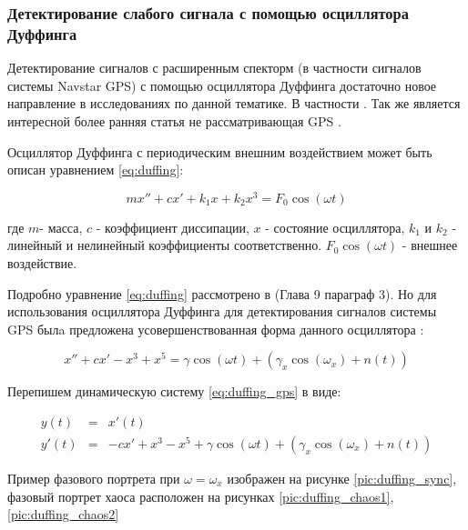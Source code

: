 \subsubsection{Детектирование слабого сигнала с помощью осциллятора Дуффинга}
\label{ssec:duffing}

Детектирование сигналов с расширенным спекторм (в частности сигналов системы Navstar GPS) с помощью осциллятора Дуффинга
достаточно новое направление в исследованиях по данной тематике. В частности
\cite{chaos_chen, chaos_cambridge, chaos_huang, chaos_song}. Так же является интересной более ранняя статья не рассматривающая GPS
\cite{chaos_wang}.

Осциллятор Дуффинга с периодическим внешним воздействием может быть описан уравнением \ref{eq:duffing}:

\begin{center}
\begin{equation}
	\label{eq:duffing}
	mx'' + cx' + k_{1}x + k_{2}x^3 = F_{0}\cos(\omega{t})
\end{equation}
\end{center}

где
$m$- масса,
$c$ - коэффициент диссипации,
$x$ - состояние осциллятора,
$k_1$ и $k_2$ - линейный и нелинейный коэффициенты соответственно.
$F_{0}\cos(\omega{t})$ - внешнее воздействие.

Подробно уравнение \ref{eq:duffing} рассмотрено в \cite{chaos_neimark_landa} (Глава 9 параграф 3). Но
для использования осциллятора Дуффинга для детектирования сигналов системы GPS былa предложена
усовершенствованная форма данного осциллятора \cite{chaos_song, chaos_chen}:

\begin{center}
\begin{equation}
	\label{eq:duffing_gps}
	x'' +cx' - x^3 + x^5 = \gamma\cos(\omega{t}) + (\gamma_{x}\cos(\omega_{x}) + n(t))
\end{equation}
\end{center}

Перепишем динамическую систему \ref{eq:duffing_gps} в виде:
\begin{center}
\begin{eqnarray}
	\label{eq:duffing_gps_2}
	y(t) & = & x'(t) \\
	y'(t) & = & -cx' + x^3 - x^5 + \gamma\cos(\omega{t}) + (\gamma_{x}\cos(\omega_{x}) + n(t))
\end{eqnarray}
\end{center}

Пример фазового портрета при ${\omega=\omega_{x}}$ изображен на рисунке \ref{pic:duffing_sync},
фазовый портрет хаоса расположен на рисунках \ref{pic:duffing_chaos1}, \ref{pic:duffing_chaos2}


